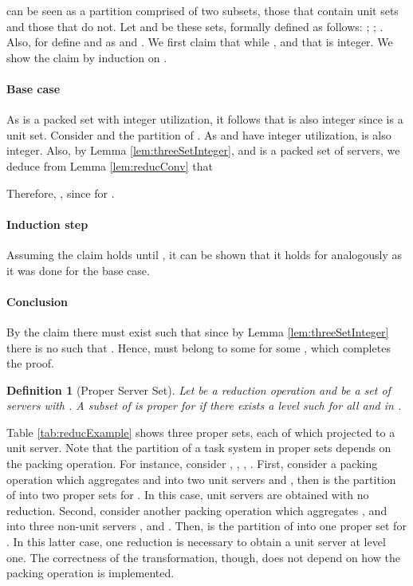 \documentclass[twocolumn, compsocconf]{IEEEtran}
\newtheorem{definition}{Definition}[section]
\newcounter{step}
\begin{document}
\begin{IEEEproof}
   can be seen as a partition comprised of two
  subsets, those that contain unit sets and those that do not.  Let  and
   be these sets, formally defined as follows: ; ; .  Also, for  define  and  as  and .  We first claim that while ,  and that  is integer.  We show
  the claim by induction on .

  \paragraph{Base case}
  As  is a packed set with integer utilization, it follows that
   is also integer since  is a unit set.  Consider  and
   the partition of .  As  and  have integer utilization,  is also
  integer.  Also, by Lemma \ref{lem:threeSetInteger},  and 
  is a packed set of servers, we deduce from Lemma \ref{lem:reducConv} that
  
  Therefore, , since  for .

  \paragraph{Induction step}
  Assuming the claim holds until , it can be shown that it holds for 
  analogously as it was done for the base case.
  \paragraph{Conclusion}
  By the claim there must exist  such that  since by Lemma
  \ref{lem:threeSetInteger} there is no  such that .  Hence,
   must belong to some  for some , which
  completes the proof.
\end{IEEEproof}
  

\begin{definition}[Proper Server Set]
  Let  be a reduction operation and
   be a set of servers with . A subset of
   is proper for  if there exists a level  such
   for all  and  in
  .
\end{definition}

Table \ref{tab:reducExample} shows three proper sets, each of which projected to
a unit server. Note that the partition of a task system in proper sets depends
on the packing operation. For instance, consider , , ,
. First, consider a packing operation 
which aggregates  and  into two unit servers
 and , then  is the
partition of  into two proper sets for . In this case, unit
servers are obtained with no reduction. Second, consider another packing
operation  which aggregates ,  and  into three non-unit servers ,  and . Then,  is the partition of  into one
proper set for . In this latter case, one reduction is necessary to
obtain a unit server at level one. The correctness of the transformation,
though, does not depend on how the packing operation is implemented.
\end{document}
